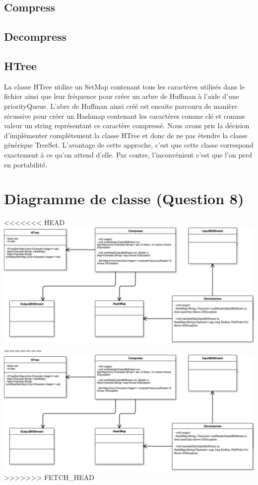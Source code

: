 \documentclass[10pt,a4paper]{article}
\begin{document}
\subsection*{Compress}


\subsection*{Decompress}


\subsection*{HTree}
La classe HTree utilise un SetMap contenant tous les caractères utilisés dans le fichier ainsi que leur fréquence pour créer un arbre de Huffman à l'aide d'une priorityQueue. L'abre de Huffman ainsi créé est ensuite parcouru de manière récussive pour créer un Hashmap contenant les caractères comme clé et comme valeur un string représentant ce caractère compressé.
Nous avons pris la décision d'implémenter complétement la classe HTree et donc de ne pas étendre la classe générique TreeSet. L'avantage de cette approche, c'est que cette classe correspond exactement à ce qu'on attend d'elle. Par contre, l'inconvénient c'est que l'on perd en portabilité.


\section*{Diagramme de classe (Question 8)}
\begin{center}
<<<<<<< HEAD
    \includegraphics[scale=0.5]{UML.png}
=======
    \includegraphics[scale=0.4]{Class_Diagram.png}
>>>>>>> FETCH_HEAD
\end{center}
\end{document}
